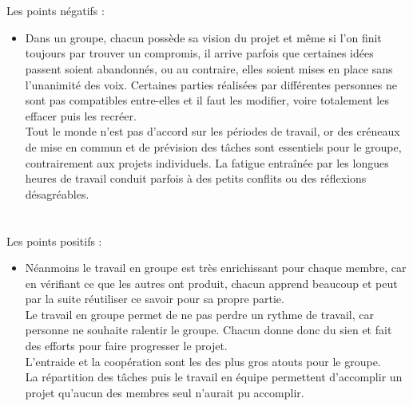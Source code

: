 \documentclass[titlepage, 13px, a4paper]{report}
\begin{document}
\paragraph{} \hspace{0pt} \\
Les points négatifs :
{\begin{itemize}
	\item	Dans un groupe, chacun possède sa vision du projet et même si l'on finit toujours par trouver un compromis, il arrive parfois que 
		certaines idées passent soient abandonnés, ou au contraire, elles soient mises en place sans l'unanimité des voix.
		Certaines parties réalisées par différentes personnes ne sont pas compatibles entre-elles et il faut les modifier, voire totalement 
		les effacer puis les recréer. \\
		Tout le monde n'est pas d'accord sur les périodes de travail, or des créneaux de mise en commun
		et de prévision des tâches sont essentiels pour le groupe, contrairement aux projets individuels.
		La fatigue entraînée par les longues heures de travail conduit parfois à des petits conflits ou des réflexions désagréables. \\
\end{itemize}} 

\paragraph{} \hspace{0pt} \\
Les points positifs :
{\begin{itemize}
	\item	Néanmoins le travail en groupe est très enrichissant pour chaque membre, car en vérifiant ce que les autres ont produit, 
		chacun apprend beaucoup et peut par la suite réutiliser ce savoir pour sa propre partie. \\
		Le travail en groupe permet de ne pas perdre un rythme de travail, car personne ne souhaite ralentir le groupe. 
		Chacun donne donc du sien et fait des efforts pour faire progresser le projet. \\
		L’entraide et la coopération sont les des plus gros atouts pour le groupe. \\
		La répartition des tâches puis le travail en équipe permettent d'accomplir un projet qu'aucun des membres seul n'aurait pu accomplir. \\
\end{itemize}} 
\end{document}
